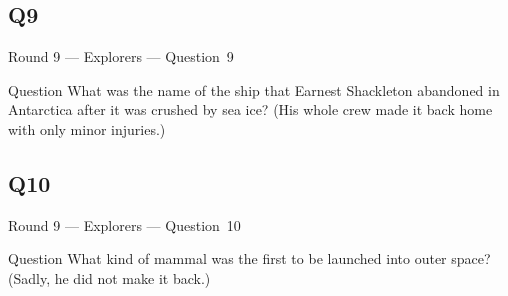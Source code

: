 \documentclass[11pt]{beamer}
\begin{document}
\subsection*{Q9}
\begin{frame}[t]{Round 9 --- Explorers --- \mbox{Question 9}}
\begin{block}{Question}
What was the name of the ship that Earnest Shackleton abandoned in Antarctica after it was crushed by sea ice? (His whole crew made it back home with only minor injuries.)
\end{block}
\end{frame}
\subsection*{Q10}
\begin{frame}[t]{Round 9 --- Explorers --- \mbox{Question 10}}
\begin{block}{Question}
What kind of mammal was the first to be launched into outer space? (Sadly, he did not make it back.)
\end{block}
\end{frame}
\end{document}
